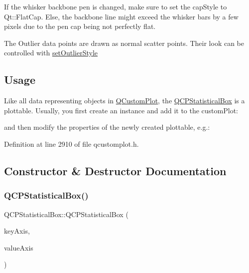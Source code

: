 If the whisker backbone pen is changed, make sure to set the cap\+Style to Qt\+::\+Flat\+Cap. Else, the backbone line might exceed the whisker bars by a few pixels due to the pen cap being not perfectly flat.

The Outlier data points are drawn as normal scatter points. Their look can be controlled with \hyperlink{class_q_c_p_statistical_box_ad5241943422eb8e58360a97e99ad6aa7}{set\+Outlier\+Style}\hypertarget{class_q_c_p_statistical_box_usage}{}\subsection{Usage}\label{class_q_c_p_statistical_box_usage}
Like all data representing objects in \hyperlink{class_q_custom_plot}{Q\+Custom\+Plot}, the \hyperlink{class_q_c_p_statistical_box}{Q\+C\+P\+Statistical\+Box} is a plottable. Usually, you first create an instance and add it to the custom\+Plot\+: 
\begin{DoxyCodeInclude}
\end{DoxyCodeInclude}
and then modify the properties of the newly created plottable, e.\+g.\+: 
\begin{DoxyCodeInclude}
\end{DoxyCodeInclude}


Definition at line 2910 of file qcustomplot.\+h.



\subsection{Constructor \& Destructor Documentation}
\mbox{\label{class_q_c_p_statistical_box_a75c2b3e7fcd0741cc981693a2ba63b27}} 
\subsubsection{\texorpdfstring{Q\+C\+P\+Statistical\+Box()}{QCPStatisticalBox()}}
{\footnotesize\ttfamily Q\+C\+P\+Statistical\+Box\+::\+Q\+C\+P\+Statistical\+Box (\begin{DoxyParamCaption}\item[{\hyperlink{class_q_c_p_axis}{Q\+C\+P\+Axis} $\ast$}]{key\+Axis,  }\item[{\hyperlink{class_q_c_p_axis}{Q\+C\+P\+Axis} $\ast$}]{value\+Axis }\end{DoxyParamCaption})\hspace{0.3cm}{\ttfamily [explicit]}}

